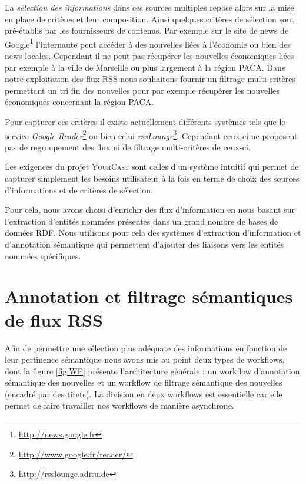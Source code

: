 \documentclass[]{easychair}
\newcommand{\Y}[0]{\textsc{YourCast}\xspace}
\begin{document}
La \textit{sélection des informations} dans ces sources multiples repose alors sur la mise en place de critères et leur composition. 
Ainsi  quelques critères de sélection sont  pré-établis par les fournisseurs de contenus.  Par exemple sur le site de news de Google\footnote{\url{http://news.google.fr}} l'internaute peut accéder à des nouvelles liées à l'économie ou bien des news locales. Cependant il ne peut pas récupérer les nouvelles économiques liées par exemple à la ville de Marseille ou plus largement à la région PACA. Dans notre exploitation des flux RSS nous souhaitons fournir un filtrage multi-critères permettant un tri fin des nouvelles pour par exemple récupérer les nouvelles économiques concernant la région PACA. 

Pour capturer ces critères il existe actuellement différents systèmes tels que le service \textsl{Google Reader}\footnote{\url{http://www.google.fr/reader/}} ou bien celui \textsl{rssLounge}\footnote{\url{http://rsslounge.aditu.de}}. Cependant ceux-ci ne proposent pas de regroupement des flux ni de filtrage multi-critères de ceux-ci. 

Les exigences du  projet \Y sont celles d'un système intuitif qui permet de capturer simplement les besoins utilisateur à la fois en terme de choix des sources d'informations et de critères de sélection.

Pour cela, nous avons choisi d'enrichir des flux d'information en nous basant sur l'extraction d'entités nommées \cite{Charton2011} présentes dans un grand nombre de bases de données RDF. Nous utilisons pour cela des systèmes d'extraction d'information et d'annotation sémantique qui permettent d'ajouter des liaisons vers les entités nommées spécifiques.



\section{Annotation et filtrage sémantiques de flux RSS}
\label{sect:miseEnOuvre}
Afin de permettre une sélection plus adéquate des informations en fonction de leur pertinence sémantique nous avons mis au point deux types de workflows, dont la figure \ref{fig:WF} présente  l'architecture générale : un workflow d'annotation sémantique des nouvelles et un workflow de filtrage sémantique des nouvelles (encadré par des tirets). La division en deux workflows est essentielle car elle permet de faire travailler nos workflows de manière asynchrone.
\end{document}
